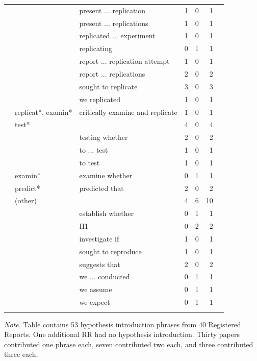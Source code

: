 \documentclass[british,,jou,floatsintext]{apa6}
\begin{document}
\begin{table}[tbp]
\begin{center}
\begin{threeparttable}
{\begin{tabular}{lllrrrr}
 &  & present ... replication & 1 & 0 & 1 & \\
 &  & present ... replications & 1 & 0 & 1 & \\
 &  & replicated ... experiment & 1 & 0 & 1 & \\
 &  & replicating & 0 & 1 & 1 & \\
 &  & report ... replication attempt & 1 & 0 & 1 & \\
 &  & report ... replications & 2 & 0 & 2 & \\
 &  & sought to replicate & 3 & 0 & 3 & \\
 &  & we replicated & 1 & 0 & 1 & \\ \midrule
 & replicat*, examin* & critically examine and replicate & 1 & 0 & 1 & \\ \midrule
 & test* &  & 4 & 0 & 4 & \\
 &  & testing whether & 2 & 0 & 2 & \\
 &  & to ... test & 1 & 0 & 1 & \\
 &  & to test & 1 & 0 & 1 & \\ \midrule
 & examin* & examine whether & 0 & 1 & 1 & \\ \midrule
 & predict* & predicted that & 2 & 0 & 2 & \\ \midrule
 & (other) &  & 4 & 6 & 10 & \\
 &  & establish whether & 0 & 1 & 1 & \\
 &  & H1 & 0 & 2 & 2 & \\
 &  & investigate if & 1 & 0 & 1 & \\
 &  & sought to reproduce & 1 & 0 & 1 & \\
 &  & suggests that & 2 & 0 & 2 & \\
 &  & we ... conducted & 0 & 1 & 1 & \\
 &  & we assume & 0 & 1 & 1 & \\
 &  & we expect & 0 & 1 & 1 & \\
\bottomrule
\addlinespace
\end{tabular}

}

\begin{tablenotes}[para]
\normalsize{\textit{Note.} Table contains 53 hypothesis introduction phrases from 40 Registered Reports. One additional RR had no hypothesis introduction. Thirty papers contributed one phrase each, seven contributed two each, and three contributed three each.}
\end{tablenotes}

\end{threeparttable}
\end{center}

\end{table}
\end{document}
